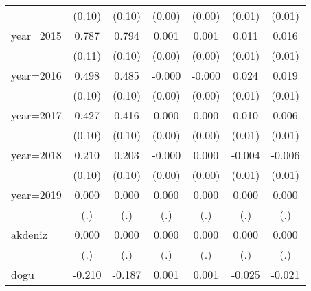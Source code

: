 {\begin{tabular}{l*{6}{c}}
                    &      (0.10)         &      (0.10)         &      (0.00)         &      (0.00)         &      (0.01)         &      (0.01)         \\
year=2015           &       0.787\sym{***}&       0.794\sym{***}&       0.001         &       0.001         &       0.011         &       0.016\sym{*}  \\
                    &      (0.11)         &      (0.10)         &      (0.00)         &      (0.00)         &      (0.01)         &      (0.01)         \\
year=2016           &       0.498\sym{***}&       0.485\sym{***}&      -0.000         &      -0.000         &       0.024\sym{**} &       0.019\sym{*}  \\
                    &      (0.10)         &      (0.10)         &      (0.00)         &      (0.00)         &      (0.01)         &      (0.01)         \\
year=2017           &       0.427\sym{***}&       0.416\sym{***}&       0.000         &       0.000         &       0.010         &       0.006         \\
                    &      (0.10)         &      (0.10)         &      (0.00)         &      (0.00)         &      (0.01)         &      (0.01)         \\
year=2018           &       0.210\sym{*}  &       0.203\sym{*}  &      -0.000         &       0.000         &      -0.004         &      -0.006         \\
                    &      (0.10)         &      (0.10)         &      (0.00)         &      (0.00)         &      (0.01)         &      (0.01)         \\
year=2019           &       0.000         &       0.000         &       0.000         &       0.000         &       0.000         &       0.000         \\
                    &         (.)         &         (.)         &         (.)         &         (.)         &         (.)         &         (.)         \\
akdeniz             &       0.000         &       0.000         &       0.000         &       0.000         &       0.000         &       0.000         \\
                    &         (.)         &         (.)         &         (.)         &         (.)         &         (.)         &         (.)         \\
dogu                &      -0.210\sym{*}  &      -0.187\sym{*}  &       0.001         &       0.001         &      -0.025\sym{***}&      -0.021\sym{**} \\

\end{tabular}}
